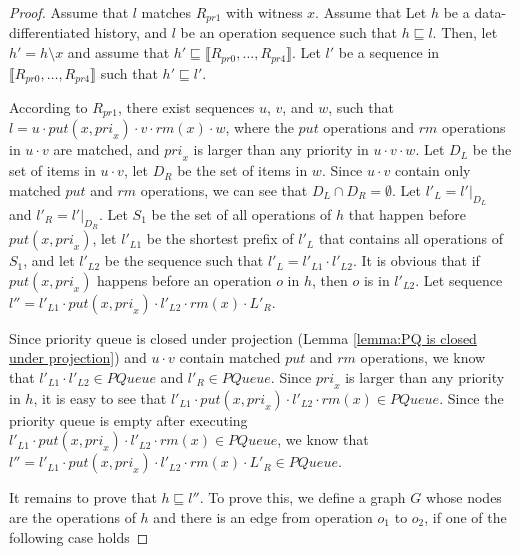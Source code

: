 \begin {proof}

Assume that $l$ matches $R_{\textit{pr1}}$ with witness $x$. Assume that  Let $h$ be a data-differentiated history, and $l$ be an operation sequence such that $h \sqsubseteq l$. Then, let $h'=h \setminus x$ and assume that $h' \sqsubseteq \llbracket R_{\textit{pr0}},\ldots,R_{\textit{pr4}} \rrbracket$. Let $l'$ be a sequence in $\llbracket R_{\textit{pr0}},\ldots,R_{\textit{pr4}} \rrbracket$ such that $h' \sqsubseteq l'$.

According to $R_{\textit{pr1}}$, there exist sequences $u$, $v$, and $w$, such that $l=u \cdot \textit{put}(x,\textit{pri}_x) \cdot v \cdot \textit{rm}(x) \cdot w$, where the $\textit{put}$ operations and $\textit{rm}$ operations in $u \cdot v$ are matched, and $\textit{pri}_x$ is larger than any priority in $u \cdot v \cdot w$. Let $D_L$ be the set of items in $u \cdot v$, let $D_R$ be the set of items in $w$. Since $u \cdot v$ contain only matched $\textit{put}$ and $\textit{rm}$ operations, we can see that $D_L \cap D_R = \emptyset$. Let $l'_L = l' \vert_{D_L}$ and $l'_R = l' \vert_{D_R}$. Let $S_1$ be the set of all operations of $h$ that happen before $\textit{put}(x,\textit{pri}_x)$, let $l'_{L1}$ be the shortest prefix of $l'_L$ that contains all operations of $S_1$, and let $l'_{L2}$ be the sequence such that $l'_L = l'_{L1} \cdot l'_{L2}$. It is obvious that if $\textit{put}(x,\textit{pri}_x)$ happens before an operation $o$ in $h$, then $o$ is in $l'_{L2}$. Let sequence $l'' = l'_{L1} \cdot \textit{put}(x,\textit{pri}_x) \cdot l'_{L2} \cdot \textit{rm}(x) \cdot L'_R$.

Since priority queue is closed under projection (Lemma \ref{lemma:PQ is closed under projection}) and $u \cdot v$ contain matched $\textit{put}$ and $\textit{rm}$ operations, we know that $l'_{L1} \cdot l'_{L2} \in \textit{PQueue}$ and $l'_R \in \textit{PQueue}$. Since $\textit{pri}_x$ is larger than any priority in $h$, it is easy to see that $l'_{L1} \cdot \textit{put}(x,\textit{pri}_x) \cdot l'_{L2} \cdot \textit{rm}(x) \in \textit{PQueue}$. Since the priority queue is empty after executing $l'_{L1} \cdot \textit{put}(x,\textit{pri}_x) \cdot l'_{L2} \cdot \textit{rm}(x) \in \textit{PQueue}$, we know that $l'' = l'_{L1} \cdot \textit{put}(x,\textit{pri}_x) \cdot l'_{L2} \cdot \textit{rm}(x) \cdot L'_R \in \textit{PQueue}$.

It remains to prove that $h \sqsubseteq l''$. To prove this, we define a graph $G$ whose nodes are the operations of $h$ and there is an edge from operation $o_1$ to $o_2$, if one of the following case holds


\end{proof}
